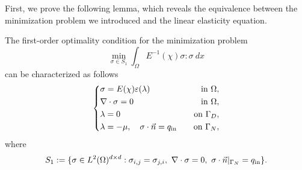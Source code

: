 \documentclass{amsart}
\begin{document}
First, we prove the following lemma, which reveals the equivalence between the minimization problem we introduced and the linear elasticity equation.
\begin{lemma}\label{stress_equ}
    The first-order optimality condition for the minimization problem 
    \begin{equation}\label{stress_problem}
        \min_{\sigma\in S_1}\int_{\Omega}E^{-1}(\chi)\sigma:\sigma\ dx
    \end{equation}
    can be characterized as follows
    \begin{equation}
    \left\{
    \begin{aligned}
    &\sigma = E(\chi)\varepsilon(\lambda) \quad &\text{in } \Omega, \\
    &\nabla \cdot \sigma = 0 \quad &\text{in } \Omega, \\
    &\lambda = 0 \quad &\text{on } \Gamma_D, \\
    &\lambda = -\mu,\quad \sigma \cdot \vec{n} = q_{\rm in} \quad &\text{on } \Gamma_N,
    \end{aligned}
    \right.
    \end{equation}
    where
    $$ S_1:=\{\sigma\in L^2(\Omega)^{d\times d}:\sigma_{i,j}=\sigma_{j,i},\ \nabla\cdot\sigma=0,\ \sigma\cdot\vec{n}|_{\Gamma_N}=q_{\rm in}\}.$$
\end{lemma}
\end{document}
